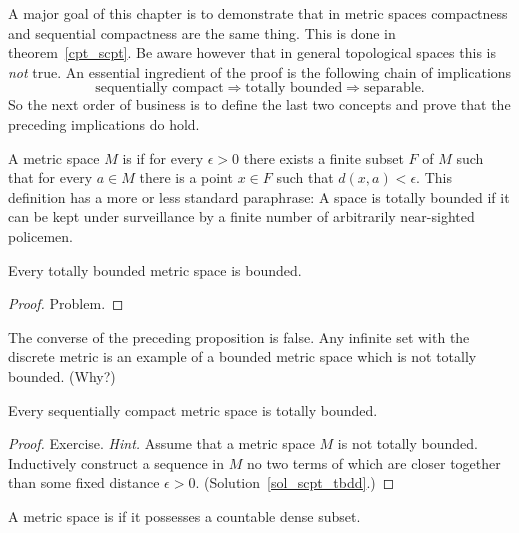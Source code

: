 A major goal of this chapter is to demonstrate that in metric spaces compactness and
sequential compactness are the same thing. This is done in theorem~\ref{cpt_scpt}.  Be aware
however that in general topological spaces this is \emph{not} true.  An essential ingredient
of the proof is the following chain of implications
 \[ \text{sequentially compact} \Longrightarrow \text{totally bounded}
                                            \Longrightarrow \text{separable}. \]
So the next order of business is to define the last two concepts and prove that the preceding
implications do hold.

\begin{defn} A metric space $M$ is
 if for every $\epsilon > 0$ there exists a finite subset $F$ of $M$ such
that for every $a \in M$ there is a point $x \in F$ such that $d(x,a) < \epsilon$.  This
definition has a more or less standard paraphrase: A space is totally bounded if it can be
kept under surveillance by a finite number of arbitrarily near-sighted policemen.
\end{defn}

\begin{prop}\label{tbdd_bdd} Every totally bounded metric space is bounded.
\end{prop}

\begin{proof} Problem.   \ns  \end{proof}

\begin{exam} The converse of the preceding proposition is false. Any infinite set with the
discrete metric is an example of a bounded metric space which is not totally bounded.  (Why?)
\end{exam}

\begin{prop}\label{scpt_tbdd} Every sequentially compact metric space is totally bounded.
\end{prop}

\begin{proof} Exercise. \emph{Hint.} Assume that a metric space $M$ is not totally bounded.
Inductively construct a sequence in $M$ no two terms of which are closer together than some
fixed distance $\epsilon > 0$. (Solution~\ref{sol_scpt_tbdd}.)    \ns
\end{proof}

\begin{defn} A metric space is
 if it possesses a countable dense subset.
\end{defn}

